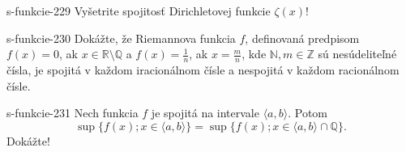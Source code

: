   \begin{defproblem}{s-funkcie-229}
  Vyšetrite spojitosť Dirichletovej funkcie $\zeta (x)$!
  \end{defproblem}

  \begin{defproblem}{s-funkcie-230}
  Dokážte, že Riemannova funkcia $f$, definovaná predpisom $f(x)=0$, ak $x \in \mathbb{R} \setminus \mathbb{Q}$ a $f(x)=\frac{1}{n}$, ak $x=\frac{m}{n}$, kde $\mathbb{N}, m \in \mathbb{Z}$ sú nesúdeliteľné čísla, je spojitá v každom iracionálnom čísle a nespojitá v každom racionálnom čísle.
  \end{defproblem}

  \begin{defproblem}{s-funkcie-231}
  Nech funkcia $f$ je spojitá na intervale $\langle a,b \rangle$. Potom $$\sup \{f(x); x \in \langle a,b \rangle\}= \sup \{f(x); x \in \langle a,b \rangle \cap \mathbb{Q}\}.$$ Dokážte!
  \end{defproblem}

